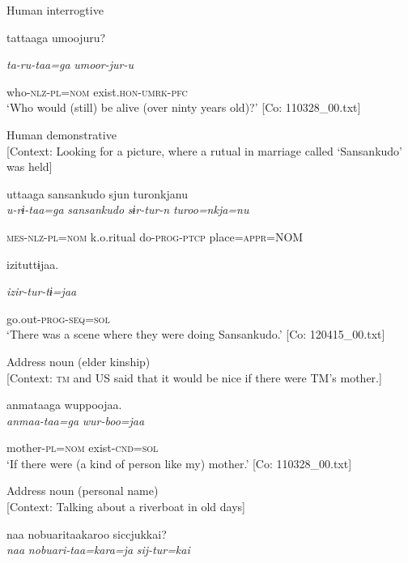 \begin{table}
\ea\label{ex:6-100}
 \ea Human interrogtive\\
\gll

{\US}
tattaaga  umoojuru?

      \textit{ta-ru-taa=ga}  \textit{umoor-jur-u}

      who-\textsc{nlz}-\textsc{pl}=\textsc{nom}  exist.\textsc{hon}-\textsc{umrk}-\textsc{pfc}\\
\glt ‘Who would (still) be alive (over ninty years old)?’ [Co: 110328\_00.txt]
\z

\ex Human demonstrative\\{}
[Context: Looking for a picture, where a rutual in marriage called ‘Sansankudo’ was held]

{\TM}
\glll uttaaga  {\textbar}sansankudo{\textbar}  sjun  turonkjanu\\

      \textit{u-rɨ-taa=ga}  \textit{sansankudo}  \textit{sɨr-tur-n}  \textit{turoo=nkja=nu}

      \textsc{mes}-\textsc{nlz}-\textsc{pl}=\textsc{nom}  k.o.ritual  do-\textsc{prog}-\textsc{ptcp}  place=\textsc{appr}=NOM

      izituttɨjaa.

      \textit{izir-tur-tɨ=jaa}

      go.out-\textsc{prog}-\textsc{seq}=\textsc{sol}\\
\glt ‘There was a scene where they were doing Sansankudo.’ [Co: 120415\_00.txt]
\z

\ex Address noun (elder kinship)\\{}
[Context: \textsc{tm} and US said that it would be nice if there were TM’s mother.]

{\TM}
\glll anmataaga  wuppoojaa.\\

      \textit{anmaa-taa=ga}  \textit{wur-boo=jaa}

      mother-\textsc{pl}=\textsc{nom}  exist-\textsc{cnd}=\textsc{sol}\\
\glt ‘If there were (a kind of person like my) mother.’ [Co: 110328\_00.txt]
\z

\ex Address noun (personal name)\\{}
[Context: Talking about a riverboat in old days]

{\TM}
\glll naa  nobuaritaakaroo  siccjukkai?\\

      \textit{naa}  \textit{nobuari-taa=kara=ja}  \textit{sij-tur=kai}


\end{table}
